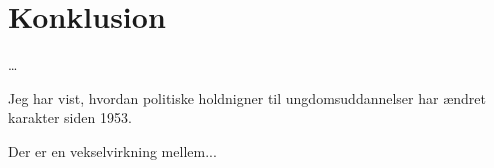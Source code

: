 \section{Konklusion}

\ldots

Jeg har vist, hvordan politiske holdnigner til ungdomsuddannelser har ændret karakter siden 1953.

Der er en vekselvirkning mellem...
